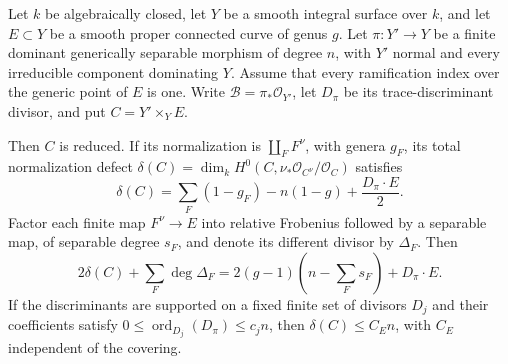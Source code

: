 \begin{lemma}
\label{D:proper-curve-arithmetic-defect}
Let \(k\) be algebraically closed, let \(Y\) be a smooth integral surface
over \(k\), and let \(E\subset Y\) be a smooth proper connected curve
of genus \(g\). Let \(\pi:Y'\to Y\) be a finite dominant generically
separable morphism of degree \(n\), with \(Y'\) normal and every
irreducible component dominating \(Y\).
Assume that every ramification index over the generic point of \(E\)
is one. Write \(\mathcal B=\pi_*\mathcal O_{Y'}\), let \(D_\pi\)
be its trace-discriminant divisor, and put \(C=Y'\times_Y E\).

Then \(C\) is reduced. If its normalization is
\(\coprod_F F^\nu\), with genera \(g_F\), its total normalization
defect
\(\delta(C)=\dim_k H^0(C,\nu_*\mathcal O_{C^\nu}/\mathcal O_C)\)
satisfies
\[
 \delta(C)=\sum_F(1-g_F)-n(1-g)+\frac{D_\pi\cdot E}{2}.
 \tag{AD1}
\]
Factor each finite map \(F^\nu\to E\) into relative Frobenius
followed by a separable map, of separable degree \(s_F\), and
denote its different divisor by \(\Delta_F\). Then
\[
 2\delta(C)+\sum_F\deg\Delta_F
       =2(g-1)\left(n-\sum_Fs_F\right)+D_\pi\cdot E.
 \tag{AD2}
\]
If the discriminants are supported on a fixed finite set of
divisors \(D_j\) and their coefficients satisfy
\(0\leq\operatorname{ord}_{D_j}(D_\pi)\leq c_j n\), then
\(\delta(C)\leq C_E n\), with \(C_E\) independent of the covering.
\end{lemma}

